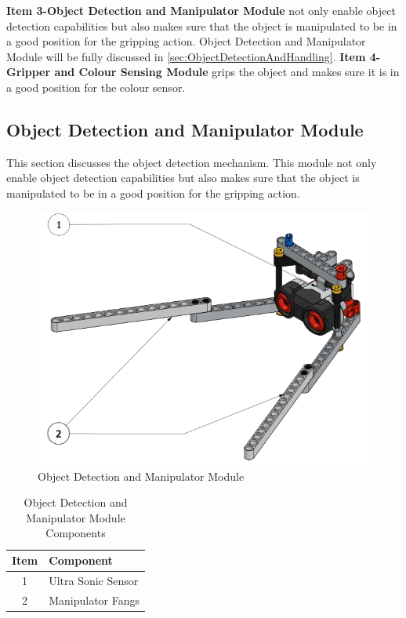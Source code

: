 \noindent \textbf{Item 3-Object Detection and Manipulator Module} not only enable object detection capabilities but also makes sure that the object is manipulated to be in a good position for the gripping action. Object Detection and Manipulator Module will be fully discussed in \vref{sec:ObjectDetectionAndHandling}. \textbf{Item 4-Gripper and Colour Sensing Module} grips the object and makes sure it is in a good position for the colour sensor.
\noindent 
\subsection{Object Detection and Manipulator Module}\label{sec:ObjectDetectionAndHandling}

\noindent This section discusses the object detection mechanism. This module not only enable object detection capabilities but also makes sure that the object is manipulated to be in a good position for the gripping action. 
\begin{figure}[!ht]
	\centering
	\includegraphics[width=0.8\linewidth]{Graphics/ObjectDetection}
	\caption{Object Detection and Manipulator Module}
	\label{fig:objectDetection}
	\vspace{-5mm}
\end{figure}

\begin{table}[!ht]
	\centering
	\caption{Object Detection and Manipulator Module Components}
	\vspace{-2mm}
	\label{tab:ObjectDetectionComponents}
	\begin{tabular}{cl}
		\hline
		\textbf{Item}&\textbf{Component}\\
		\hline
		1&Ultra Sonic Sensor\\
		2&Manipulator Fangs\\
		\hline			
	\end{tabular}
\end{table}

